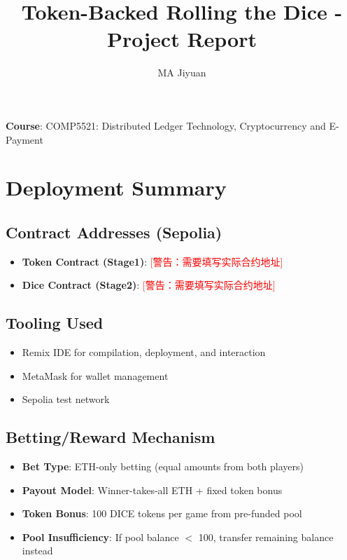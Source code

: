 \documentclass[10pt,a4paper]{article}
\title{\textbf{Token-Backed Rolling the Dice - Project Report}}
\author{MA Jiyuan}
\begin{document}
\maketitle

\noindent\textbf{Course}: COMP5521: Distributed Ledger Technology, Cryptocurrency and E-Payment

\section{Deployment Summary}

\subsection*{Contract Addresses (Sepolia)}
\begin{itemize}
    \item \textbf{Token Contract (Stage1)}: \textcolor{red}{[警告：需要填写实际合约地址]}
    \item \textbf{Dice Contract (Stage2)}: \textcolor{red}{[警告：需要填写实际合约地址]}
\end{itemize}

\subsection*{Tooling Used}
\begin{itemize}
    \item Remix IDE for compilation, deployment, and interaction
    \item MetaMask for wallet management
    \item Sepolia test network
\end{itemize}

\subsection*{Betting/Reward Mechanism}
\begin{itemize}
    \item \textbf{Bet Type}: ETH-only betting (equal amounts from both players)
    \item \textbf{Payout Model}: Winner-takes-all ETH + fixed token bonus
    \item \textbf{Token Bonus}: 100 DICE tokens per game from pre-funded pool
    \item \textbf{Pool Insufficiency}: If pool balance $<$ 100, transfer remaining balance instead
\end{itemize}
\end{document}
